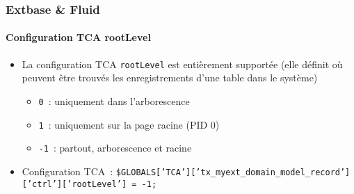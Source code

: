 \begin{frame}[fragile]
	\frametitle{Extbase \& Fluid}
	\framesubtitle{Configuration TCA rootLevel}

	\lstset{basicstyle=\small\ttfamily}

	\begin{itemize}

		\item La configuration TCA \texttt{rootLevel} est entièrement supportée\newline
			\small(elle définit où peuvent être trouvés les enregistrements d'une table dans le système)\normalsize

			\begin{itemize}
				\item \texttt{0}~: uniquement dans l'arborescence
				\item \texttt{1}~: uniquement sur la page racine (PID 0)
				\item \texttt{-1}~: partout, arborescence et racine
			\end{itemize}

		\item Configuration TCA~:\newline
			\tiny
				\texttt{\$GLOBALS['TCA']['tx\_myext\_domain\_model\_record']['ctrl']['rootLevel'] = -1;}
			\normalsize

	\end{itemize}

\end{frame}

